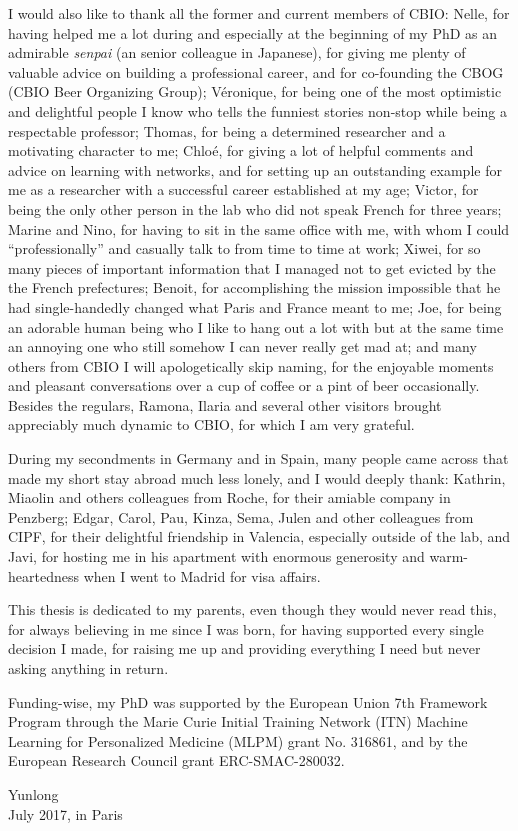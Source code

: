 I would also like to thank all the former and current members of CBIO: Nelle, for having helped me a lot during and especially at the beginning of my PhD as an admirable \textit{senpai} (an senior colleague in Japanese), for giving me plenty of valuable advice on building a professional career, and for co-founding the CBOG (CBIO Beer Organizing Group); V\'{e}ronique, for being one of the most optimistic and delightful people I know who tells the funniest stories non-stop while being a respectable professor; Thomas, for being a determined researcher and a motivating character to me; Chlo\'{e}, for giving a lot of helpful comments and advice on learning with networks, and for setting up an outstanding example for me as a researcher with a successful career established at my age; Victor, for being the only other person in the lab who did not speak French for three years; Marine and Nino, for having to sit in the same office with me, with whom I could ``professionally'' and casually talk to from time to time at work; Xiwei, for so many pieces of important information that I managed not to get evicted by the the French prefectures; Benoit, for accomplishing the mission impossible that he had single-handedly changed what Paris and France meant to me; Joe, for being an adorable human being who I like to hang out a lot with but at the same time an annoying one who still somehow I can never really get mad at; and many others from CBIO I will apologetically skip naming, for the enjoyable moments and pleasant conversations over a cup of coffee or a pint of beer occasionally. Besides the regulars, Ramona, Ilaria and several other visitors brought appreciably much dynamic to CBIO, for which I am very grateful.


During my secondments in Germany and in Spain, many people came across that made my short stay abroad much less lonely, and I would deeply thank: Kathrin, Miaolin and others colleagues from Roche, for their amiable company in Penzberg; Edgar, Carol, Pau, Kinza, Sema, Julen and other colleagues from CIPF, for their delightful friendship in Valencia, especially outside of the lab, and Javi, for hosting me in his apartment with enormous generosity and warm-heartedness when I went to Madrid for visa affairs.


This thesis is dedicated to my parents, even though they would never read this, for always believing in me since I was born, for having supported every single decision I made, for raising me up and providing everything I need but never asking anything in return.


Funding-wise, my PhD was supported by the European Union 7th Framework Program through the Marie Curie Initial Training Network (ITN) Machine Learning for Personalized Medicine (MLPM) grant No. 316861, and by the European Research Council grant ERC-SMAC-280032.


\begin{flushright}
Yunlong
\\
July 2017, in Paris
\end{flushright}
